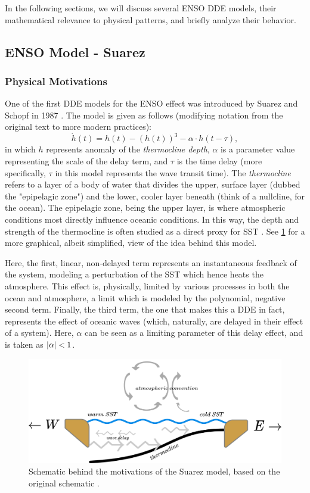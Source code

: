 \documentclass[12pt]{article}
\begin{document}
In the following sections, we will discuss several ENSO DDE models, their mathematical relevance to physical patterns, and briefly analyze their behavior.

\subsection{ENSO Model - Suarez}
\subsubsection{Physical Motivations}
One of the first DDE models for the ENSO effect was introduced by Suarez and Schopf in 1987 \cite{ensomodel}. The model is given as follows (modifying notation from the original text to more modern practices):
\begin{equation}\label{eqn:daoensomodel}
    \dot{h}(t) = h(t) - \left(h(t)\right)^3 - \alpha\cdot  h(t - \tau),
\end{equation}
in which $h$ represents anomaly of the \emph{thermocline depth}, $\alpha$ is a parameter value representing the scale of the delay term, and $\tau$ is the time delay (more specifically, $\tau$ in this model represents the wave transit time). The \emph{thermocline} refers to a layer of a body of water that divides the upper, surface layer (dubbed the "epipelagic zone") and the lower, cooler layer beneath (think of a nullcline, for the ocean)\cite{thermocline}. The epipelagic zone, being the upper layer, is where atmospheric conditions most directly influence oceanic conditions. In this way, the depth and strength of the thermocline is often studied as a direct proxy for SST \cite{randomnino}\cite{climatedde}. See \cref{fig:suarezschematic} for a more graphical, albeit simplified, view of the idea behind this model.

Here, the first, linear, non-delayed term represents an instantaneous feedback of the system, modeling a perturbation of the SST which hence heats the atmosphere. This effect is, physically, limited by various processes in both the ocean and atmosphere, a limit which is modeled by the polynomial, negative second term. Finally, the third term, the one that makes this a DDE in fact, represents the effect of oceanic waves (which, naturally, are delayed in their effect of a system). Here, $\alpha$ can be seen as a limiting parameter of this delay effect, and is taken as $\left|\alpha\right| < 1$.

\begin{figure}
    \centering
    \includegraphics*[width=0.7\linewidth]{figures/suarezmodel.png}
    \caption{Schematic behind the motivations of the Suarez model, based on the original schematic \cite{ensomodel}.}
    \label{fig:suarezschematic}
\end{figure}
\end{document}
